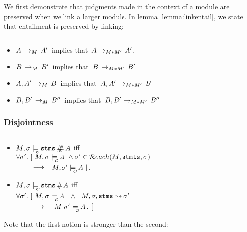We first demonstrate that judgments made in the context of a module are preserved when we link a larger module.
In lemma \ref{lemma:linkentail}, we state that entailment is preserved by linking:

\begin{lemma}
\label{lemma:linkentail}
$ $ \\

\begin{itemize}
\item
$A\, \rightarrow_{M}\, A'$\ implies that\  $A  \rightarrow_{M*M'}\, A'$.
\item
$B\, \rightarrow_{M}\, B'$\ implies that\  $B\, \rightarrow_{M*M'}\,  B'$
 \item
$A,A'\, \rightarrow_{M}\, B$\ implies that\  $A,A'\, \rightarrow_{M*M'}\,  B$
\item
$B,B'\, \rightarrow_{M}\, B''$\ implies that\  $B,B'\, \rightarrow_{M*M'}\,  B''$
\end{itemize}
\end{lemma}


\subsubsection{Disjointness}

\begin{definition}[Disjointness]\label{defn:disjointness}
$ $ \\
\begin{itemize}
\item
{$\M,\sigma \modelsWithO   \prg{stms} \ddisj \A$ iff }\\
$\forall \sigma'. \ [ \ \M,\sigma  \modelsWithO   \A\ \wedge  \sigma'\in\Reach(\M,\stmts,\sigma)$ \\ $\strut \hspace{.3in}   \longrightarrow$\ \
  $\M,\sigma'  \modelsWithO   \A \ ]$.
\item
$\M,\sigma \modelsWithO   \prg{stms} \disj \A$ iff \\
 $\forall \sigma'. \ [  \ \M,\sigma  \modelsWithO   \A$ \  $\wedge$ \  $M,\sigma, {\textrm{\ttfamily{stms}}} \leadsto \sigma'$ \\ $\strut \hspace{.3in}   \longrightarrow$ \ \ $\M,\sigma'  \modelsWithO   \A$.\ ]
\end{itemize}
\end{definition}

Note that the first notion is stronger than the second:

